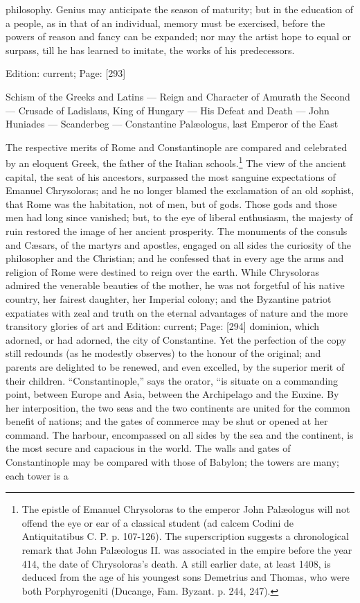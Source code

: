 philosophy. Genius may anticipate the season of maturity; but in the education of a people, as in that of an individual, memory must be exercised, before the powers of reason and fancy can be expanded; nor may the artist hope to equal or surpass, till he has learned to imitate, the works of his predecessors.

Edition: current; Page: [293]


Schism of the Greeks and Latins \texthebrew{—} Reign and Character of Amurath the Second \texthebrew{—} Crusade of Ladislaus, King of Hungary \texthebrew{—} His Defeat and Death \texthebrew{—} John Huniades \texthebrew{—} Scanderbeg \texthebrew{—} Constantine Palæologus, last Emperor of the East

The respective merits of Rome and Constantinople are compared and celebrated by an eloquent Greek, the father of the Italian schools.\footnote{The epistle of Emanuel Chrysoloras to the emperor John Palæologus will not offend the eye or ear of a classical student (ad calcem Codini de Antiquitatibus C. P. p. 107-126). The superscription suggests a chronological remark that John Palæologus II. was associated in the empire before the year 414, the date of Chrysoloras\texthebrew{}’s death. A still earlier date, at least 1408, is deduced from the age of his youngest sons Demetrius and Thomas, who were both Porphyrogeniti (Ducange, Fam. Byzant. p. 244, 247).} The view of the ancient capital, the seat of his ancestors, surpassed the most sanguine expectations of Emanuel Chrysoloras; and he no longer blamed the exclamation of an old sophist, that Rome was the habitation, not of men, but of gods. Those gods and those men had long since vanished; but, to the eye of liberal enthusiasm, the majesty of ruin restored the image of her ancient prosperity. The monuments of the consuls and Cæsars, of the martyrs and apostles, engaged on all sides the curiosity of the philosopher and the Christian; and he confessed that in every age the arms and religion of Rome were destined to reign over the earth. While Chrysoloras admired the venerable beauties of the mother, he was not forgetful of his native country, her fairest daughter, her Imperial colony; and the Byzantine patriot expatiates with zeal and truth on the eternal advantages of nature and the more transitory glories of art and Edition: current; Page: [294] dominion, which adorned, or had adorned, the city of Constantine. Yet the perfection of the copy still redounds (as he modestly observes) to the honour of the original; and parents are delighted to be renewed, and even excelled, by the superior merit of their children. \texthebrew{“}Constantinople,\texthebrew{}” says the orator, \texthebrew{“}is situate on a commanding point, between Europe and Asia, between the Archipelago and the Euxine. By her interposition, the two seas and the two continents are united for the common benefit of nations; and the gates of commerce may be shut or opened at her command. The harbour, encompassed on all sides by the sea and the continent, is the most secure and capacious in the world. The walls and gates of Constantinople may be compared with those of Babylon; the towers are many; each tower is a 